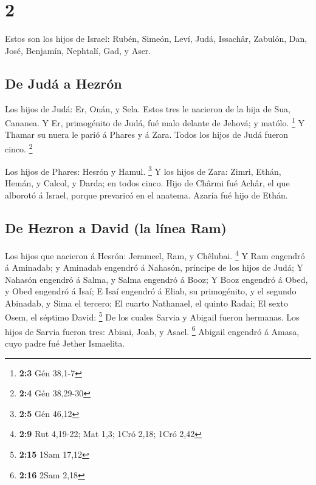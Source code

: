 \hypertarget{section-1}{%
\section{2}\label{section-1}}

 Estos son los hijos de Israel: Rubén, Simeón, Leví, Judá,
Issachâr, Zabulón,  Dan, José, Benjamín, Nephtalí, Gad, y
Aser.

\hypertarget{de-juduxe1-a-hezruxf3n}{%
\subsection{De Judá a Hezrón}\label{de-juduxe1-a-hezruxf3n}}

 Los hijos de Judá: Er, Onán, y Sela. Estos tres le nacieron
de la hija de Sua, Cananea. Y Er, primogénito de Judá, fué malo delante
de Jehová; y matólo. \footnote{\textbf{2:3} Gén 38,1-7}  Y
Thamar su nuera le parió á Phares y á Zara. Todos los hijos de Judá
fueron cinco. \footnote{\textbf{2:4} Gén 38,29-30}

 Los hijos de Phares: Hesrón y Hamul. \footnote{\textbf{2:5}
  Gén 46,12}  Y los hijos de Zara: Zimri, Ethán, Hemán, y
Calcol, y Darda; en todos cinco.  Hijo de Chârmi fué Achâr,
el que alborotó á Israel, porque prevaricó en el anatema. 
Azaría fué hijo de Ethán.

\hypertarget{de-hezron-a-david-la-luxednea-ram}{%
\subsection{De Hezron a David (la línea
Ram)}\label{de-hezron-a-david-la-luxednea-ram}}

 Los hijos que nacieron á Hesrón: Jerameel, Ram, y Chêlubai.
\footnote{\textbf{2:9} Rut 4,19-22; Mat 1,3; 1Cró 2,18; 1Cró 2,42}
 Y Ram engendró á Aminadab; y Aminadab engendró á Nahasón,
príncipe de los hijos de Judá;  Y Nahasón engendró á Salma,
y Salma engendró á Booz;  Y Booz engendró á Obed, y Obed
engendró á Isaí;  E Isaí engendró á Eliab, su primogénito,
y el segundo Abinadab, y Sima el tercero;  El cuarto
Nathanael, el quinto Radai;  El sexto Osem, el séptimo
David: \footnote{\textbf{2:15} 1Sam 17,12}  De los cuales
Sarvia y Abigail fueron hermanas. Los hijos de Sarvia fueron tres:
Abisai, Joab, y Asael. \footnote{\textbf{2:16} 2Sam 2,18} 
Abigail engendró á Amasa, cuyo padre fué Jether Ismaelita.

